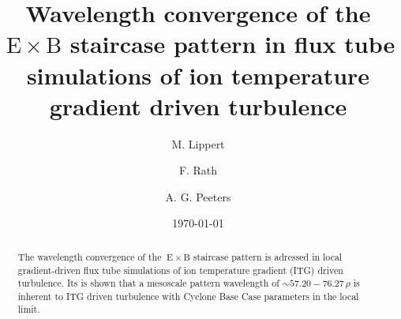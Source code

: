 \documentclass[aip, amsmath, amssymb, reprint, twocolumn]{revtex4-1}
\newcommand{\exb}{\mathrm{\:E}\times\mathrm{B}}
\newcommand{\rhoth}{\rho}
\begin{document}

\title[Wavelength convergence of the $\exb$ staircase pattern in flux tube simulations of ion temperature gradient driven turbulence]
{Wavelength convergence of the $\exb$ staircase pattern in flux tube simulations of ion temperature gradient driven turbulence}

\author{M. Lippert}
\author{F. Rath}
\author{A. G. Peeters}

\date{\today}


\begin{abstract}
    The wavelength convergence of the $\exb$ staircase pattern is adressed in local gradient-driven flux tube simulations of ion temperature gradient (ITG) driven turbulence.
    Its is shown that a mesoscale pattern wavelength of \linebreak $\sim 57.20-76.27\,\rhoth$ is inherent to ITG driven turbulence with Cyclone Base Case parameters in the local limit. 
    
\end{abstract}

\maketitle



\end{document}
